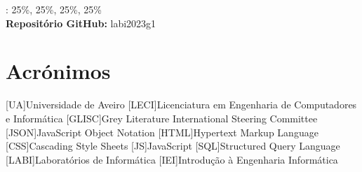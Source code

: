 \documentclass{report}
\begin{document}
\autores : 25\%, 25\%, 25\%, 25\%\\

\textbf{Repositório GitHub:} labi2023g1

\chapter*{Acrónimos}
\begin{acronym}
    [UA]{Universidade de Aveiro}
    [LECI]{Licenciatura em Engenharia de Computadores e Informática}
    [GLISC]{Grey Literature International Steering Committee}
    [JSON]{JavaScript Object Notation}
    [HTML]{Hypertext Markup Language}
    [CSS]{Cascading Style Sheets}
    [JS]{JavaScript}
    [SQL]{Structured Query Language}
    [LABI]{Laboratórios de Informática}
    [IEI]{Introdução à Engenharia Informática}
\end{acronym}


\printbibliography
\end{document}

